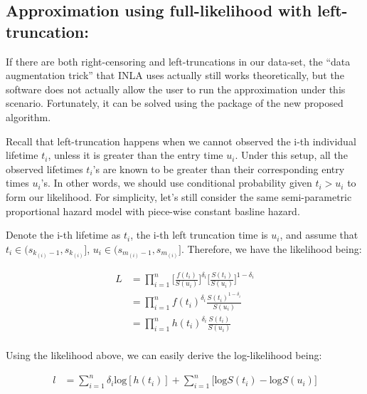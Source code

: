\documentclass[]{article}
\begin{document}
\hypertarget{approximation-using-full-likelihood-with-left-truncation}{%
\subsection{Approximation using full-likelihood with
left-truncation:}\label{approximation-using-full-likelihood-with-left-truncation}}

If there are both right-censoring and left-truncations in our data-set,
the ``data augmentation trick'' that INLA uses actually still works
theoretically, but the software does not actually allow the user to run
the approximation under this scenario. Fortunately, it can be solved
using the package of the new proposed algorithm.

Recall that left-truncation happens when we cannot observed the i-th
individual lifetime \(t_i\), unless it is greater than the entry time
\(u_i\). Under this setup, all the observed lifetimes \(t_i\)'s are
known to be greater than their corresponding entry times \(u_i\)'s. In
other words, we should use conditional probability given \(t_i > u_i\)
to form our likelihood. For simplicity, let's still consider the same
semi-parametric proportional hazard model with piece-wise constant
basline hazard.

Denote the i-th lifetime as \(t_i\), the i-th left truncation time is
\(u_i\), and assume that \(t_i \in (s_{k_{(i)}-1},s_{k_{(i)}}]\),
\(u_i \in (s_{m_{(i)}-1},s_{m_{(i)}}]\). Therefore, we have the
likelihood being:

\begin{equation}\begin{aligned}\label{eqn:lt}
L &= \prod_{i=1}^{n} {\bigg[\frac{f(t_i)}{S(u_i)}\bigg]^{\delta_i}\bigg[\frac{S(t_i)}{S(u_i)}\bigg]^{1- \delta_i}} \\
  &= \prod_{i=1}^{n} {f(t_i)^{\delta_i}}{\frac{S(t_i)^{1-\delta_i}}{S(u_i)}} \\
  &= \prod_{i=1}^{n} {h(t_i)^{\delta_i}}{\frac{S(t_i)}{S(u_i)}} \\
\end{aligned}\end{equation}

Using the likelihood above, we can easily derive the log-likelihood
being:

\begin{equation}\begin{aligned}\label{eqn:lt_log}
l &= \sum_{i=1}^{n} {{\delta_i}\text{log}[h(t_i)]} + \sum_{i=1}^{n} {\big[\text{log}S(t_i)-\text{log}S(u_i)\big]}  \\
\end{aligned}\end{equation}
\end{document}

